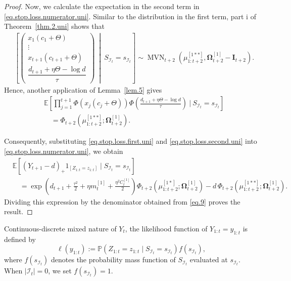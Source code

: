 \documentclass[11pt,authoryear]{elsarticle}
\def\P#1{{\mathbb{P}}\left(#1\right)}
\def\E#1{{\mathbb E}\left[#1\right]}
\theoremstyle{nopunct}
\numberwithin{equation}{section}
\begin{document}
\begin{proof}
Now, we calculate the expectation in the second term in
\eqref{eq.stop.loss.numerator.uni}.
Similar to the distribution in the first term, part i of
Theorem~\ref{thm.2.uni} shows that
\[
\begin{aligned}
&\left[
\begin{pmatrix}
x_1(c_1+\Theta)\\
\vdots\\
x_{t+1}(c_{t+1}+\Theta)\\[0.15cm]
\dfrac{
d_{t+1}+\eta\Theta-\log d
}{\tau}
\end{pmatrix}
\ \middle|\
S_{\mathcal I_t}=s_{\mathcal I_t}
\right]\sim
\operatorname{MVN}_{t+2}
\left(
\mu_{1:t+2}^{[1**]},
\boldsymbol\Omega_{t+2}^{[1]}-\boldsymbol I_{t+2}
\right).
\end{aligned}
\]
Hence, another application of Lemma~\ref{lem.5} gives
\begin{equation}\label{eq.stop.loss.second.uni}
\begin{aligned}
&\E{
\prod_{j=1}^{t+1}
\Phi\left(
x_j(c_j+\Theta)
\right)
\Phi\left(
\frac{
d_{t+1}+\eta\Theta-\log d
}{\tau}
\right)
\ \bigg|\
S_{\mathcal I_t}=s_{\mathcal I_t}
}\\
&\quad=
\Phi_{t+2}
\left(
\mu_{1:t+2}^{[1**]};
\boldsymbol\Omega_{t+2}^{[1]}
\right).
\end{aligned}
\end{equation}

Consequently, substituting \eqref{eq.stop.loss.first.uni} and
\eqref{eq.stop.loss.second.uni} into
\eqref{eq.stop.loss.numerator.uni}, we obtain
\[
\begin{aligned}
&\E{
(Y_{t+1}-d)_+
1_{\left[Z_{1:t}=z_{1:t}\right]}
\mid
S_{\mathcal I_t}=s_{\mathcal I_t}
}\\
&\quad=
\exp\left(
d_{t+1}
+
\frac{\tau^2}{2}
+
\eta m_t^{[1]}
+
\frac{\eta^2C_t^{[1]}}{2}
\right)
\Phi_{t+2}
\left(
\mu_{1:t+2}^{[1*]};
\boldsymbol\Omega_{t+2}^{[1]}
\right)-
d\,
\Phi_{t+2}
\left(
\mu_{1:t+2}^{[1**]};
\boldsymbol\Omega_{t+2}^{[1]}
\right).
\end{aligned}
\]
Dividing this expression by the denominator obtained from
\eqref{eq.9} proves the result.
\end{proof}







Continuous-discrete mixed nature of $Y_t$, the likelihood function of $Y_{1:t}=y_{1:t}$ is defined by
\begin{equation}\label{eq.likelihood.factorization.uni}
\ell(y_{1:t})
:=
\P{
Z_{1:t}=z_{1:t}
\mid
S_{\mathcal I_t}=s_{\mathcal I_t}
}
f(s_{\mathcal I_t}),
\end{equation}
where \(f(s_{\mathcal I_t})\) denotes the probability mass function of $S_{\mathcal I_t}$ evaluated at $s_{\mathcal I_t}$.
When \(\left\vert\mathcal I_t\right\vert=0\), we set \(f(s_{\mathcal I_t})=1\).
\end{document}
